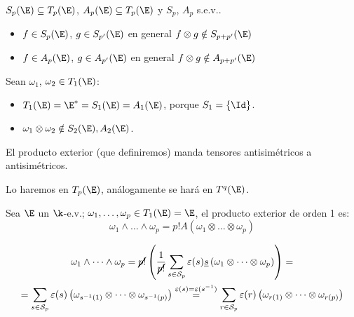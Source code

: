 \begin{obs}
    $ S_p(\E) \subseteq T_p(\E) $, $ A_p(\E) \subseteq T_p(\E) $ y $ S_p
    $, $ A_p $ s.e.v..
    \begin{itemize}
        \item
            $ f \in S_p(\E) $, $ g \in S_{p'}(\E) $ en general $ f
            \otimes g \notin S_{p+p'}(\E) $
        \item
            $ f \in A_p(\E) $, $ g \in A_{p'}(\E) $ en general $ f
            \otimes g \notin A_{p+p'}(\E) $
    \end{itemize}
\end{obs}
\begin{example}
    Sean $ \omega_1 $, $ \omega_2 \in T_1(\E) $:
    \begin{itemize}
        \item
            $ T_1(\E) = \E^* = S_1(\E) = A_1(\E) $, porque $ S_1 = \{\Id\}
            $.
        \item
            $ \omega_1 \otimes \omega_2 \notin S_2(\E), A_2(\E) $.
    \end{itemize}
\end{example}
\begin{obs}
    El producto exterior (que definiremos) manda tensores
    antisimétricos a antisimétricos.
\end{obs}
\begin{obs}
    Lo haremos en $ T_p(\E) $, análogamente se hará en $ T^q(\E) $.
\end{obs}
\begin{defi}
    \label{pr_ext} Sea $ \E $ un $ \k $-e.v.; $ \omega_1, \dots, \omega_p
    \in T_1(\E) = \E $, el producto exterior de orden 1 es:
    \[
        \omega_1 \wedge \dots \wedge \omega_p = p!  A(\omega_1 \otimes
        \dots \otimes \omega_p)
    \]
\end{defi}
\begin{obs}
    \label{obs_pr_ext}
    \begin{gather*}
        \omega_1 \wedge \dots \wedge \omega_p = \cancel{p!} \left( \frac
        {1}{\cancel{p!}}\sum_{s \in \mathcal{S}_p} \varepsilon(s)
        \underline{s}\left(\omega_1 \otimes \dots \otimes \omega_p
        \right) \right) = \\
        = \sum_{s \in \mathcal{S}_p} \varepsilon(s) \left( \omega_{s^{-1}
        (1)} \otimes \dots \otimes \omega_{s^{-1}(p)} \right) \stackrel{\varepsilon
        (s) = \varepsilon(s^{-1})}{=} \sum_{r \in \mathcal{S}_p}
        \varepsilon(r) \left( \omega_{r(1)} \otimes \dots \otimes \omega_
        {r(p)} \right)
    \end{gather*}
\end{obs}
